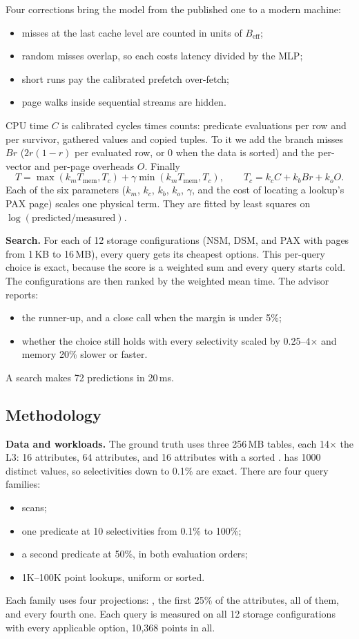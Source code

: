 Four corrections bring the model from the published one to a modern machine:
\begin{itemize}
  \item misses at the last cache level are counted in units of $B_\mathrm{eff}$;
  \item random misses overlap, so each costs latency divided by the MLP;
  \item short runs pay the calibrated prefetch over-fetch;
  \item page walks inside sequential streams are hidden.
\end{itemize}
CPU time $C$ is calibrated cycles times counts: predicate evaluations per row and per
survivor, gathered values and copied tuples. To it we add the branch misses $\mathit{Br}$
($2r(1-r)$ per evaluated row, or 0 when the data is sorted) and the per-vector and per-page
overheads $O$. Finally
\[ T=\max(k_m T_\mathrm{mem}, T_c)+\gamma\min(k_m T_\mathrm{mem}, T_c),\qquad
   T_c=k_c C+k_b \mathit{Br}+k_o O . \]
Each of the six parameters ($k_m$, $k_c$, $k_b$, $k_o$, $\gamma$, and the cost of locating a
lookup's PAX page) scales one physical term. They are fitted by least squares on
$\log(\text{predicted}/\text{measured})$.

\textbf{Search.} For each of 12 storage configurations (NSM, DSM, and PAX with pages from
1\,KB to 16\,MB), every query gets its cheapest options. This per-query choice is exact, because
the score is a weighted sum and every query starts cold. The configurations are then ranked by
the weighted mean time. The advisor reports:
\begin{itemize}
  \item the runner-up, and a close call when the margin is under 5\%;
  \item whether the choice still holds with every selectivity scaled by 0.25--4$\times$ and
  memory 20\% slower or faster.
\end{itemize}
A search makes 72 predictions in 20\,ms.

\subsection{Methodology}
\textbf{Data and workloads.} The ground truth uses three 256\,MB tables, each 14$\times$ the
L3: 16 attributes, 64 attributes, and 16 attributes with a sorted .  has
1000 distinct values, so selectivities down to 0.1\% are exact. There are four query families:
\begin{itemize}
  \item scans;
  \item one predicate at 10 selectivities from 0.1\% to 100\%;
  \item a second predicate at 50\%, in both evaluation orders;
  \item 1K--100K point lookups, uniform or sorted.
\end{itemize}
Each family uses four projections: , the first 25\% of the attributes, all of them,
and every fourth one. Each query is measured on all 12 storage configurations with every
applicable option, 10,368 points in all.

